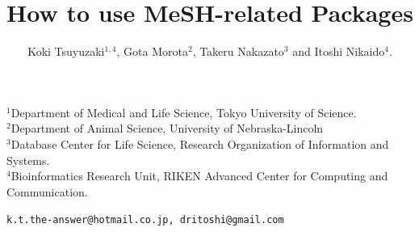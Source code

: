 \documentclass[11pt]{article}
\begin{document}
\title{\bf How to use MeSH-related Packages}
\author{Koki Tsuyuzaki$^{1,4}$, Gota Morota$^2$, Takeru Nakazato$^3$ and Itoshi Nikaido$^4$.}
\maketitle
\begin{center}
\noindent
$^1$Department of Medical and Life Science, Tokyo University of Science.\\
\noindent
$^2$Department of Animal Science, University of Nebraska-Lincoln\\
\noindent
$^3$Database Center for Life Science, Research Organization of Information and Systems.\\
\noindent
$^4$Bioinformatics Research Unit, RIKEN Advanced Center for Computing and Communication.\\
\end{center}

\begin{center}
{\tt k.t.the-answer@hotmail.co.jp, dritoshi@gmail.com}
\end{center}
\tableofcontents

\newpage
\end{document}
